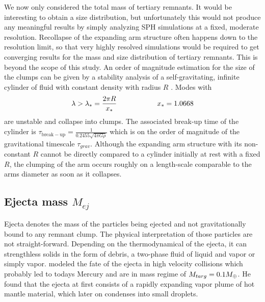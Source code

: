 We now only considered the total mass of tertiary remnants. It would be interesting to obtain a size distribution, but unfortunately this would not produce any meaningful results by simply analyzing SPH simulations at a fixed, moderate resolution. Recollapse of the expanding arm structure often happens down to the resolution limit, so that very highly resolved simulations would be required to get converging results for the mass and size distribution of tertiary remnants. This is beyond the scope of this study. An order of magnitude estimation for the size of the clumps can be given by a stability analysis of a self-gravitating, infinite cylinder of fluid with constant density with radius $R$ \citep{1961Chandrasekhar.C}. Modes with
\begin{align}
\lambda > \lambda_{*} = \frac{2 \pi R}{x_*} \hspace{2.0cm} x_* = 1.0668
\end{align} 
are unstable and collapse into clumps. The associated break-up time of the cylinder is $\tau_{\mathrm{break-up}} = \frac{1}{0.2455 \sqrt{4 \pi G \rho} }$ which is on the order of magnitude of the gravitational timescale $\tau_{grav}$. Although the expanding arm structure with its non-constant $R$ cannot be directly compared to a cylinder initially at rest with a fixed $R$, the clumping of the arm occurs roughly on a length-scale comparable to the arms diameter as soon as it collapses.

\subsection{Ejecta mass $M_{ej}$}
Ejecta denotes the mass of the particles being ejected and not gravitationally bound to any remnant clump. The physical interpretation of those particles are not straight-forward. Depending on the thermodynamical of the ejecta, it can strengthless solids in the form of debris, a two-phase fluid of liquid and vapor or simply vapor. \cite{Anic:2006p99} modeled the fate of the ejecta in high velocity collisions which probably led to todays Mercury and are in mass regime of $M_{targ} = 0.1 M_{\oplus}$. He found that the ejecta at first consists of a rapidly expanding vapor plume of hot mantle material, which later on condenses into small droplets. 

